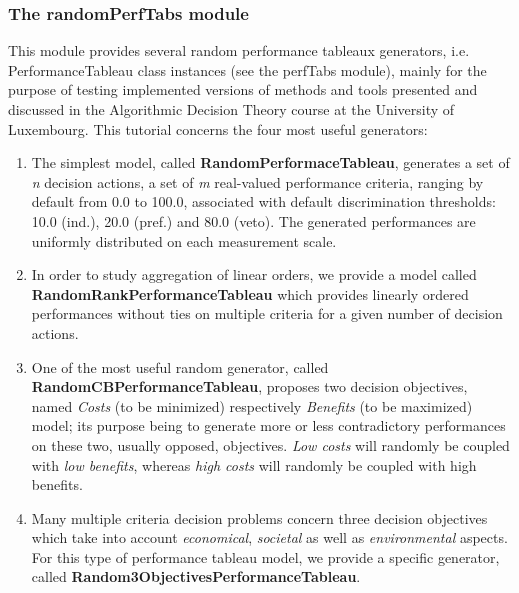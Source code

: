 \documentclass[letterpaper,10pt,english]{sphinxmanual}
\begin{document}
\subsubsection{The randomPerfTabs module}
\label{tutorial:the-randomperftabs-module}
This module provides several random performance tableaux generators, i.e. PerformanceTableau class instances (see the perfTabs module), mainly for the purpose of testing implemented versions of methods and tools presented and discussed in the Algorithmic Decision Theory course at the University of Luxembourg. This tutorial concerns the four most useful generators:
\begin{enumerate}
\item {} 
The simplest model, called \textbf{RandomPerformaceTableau}, generates
a set of \emph{n} decision actions, a set of \emph{m} real-valued
performance criteria, ranging by default from 0.0 to 100.0,
associated with default discrimination thresholds: 10.0 (ind.), 20.0 (pref.) and 80.0 (veto). The generated performances are uniformly distributed on each measurement scale.

\item {} 
In order to study aggregation of linear orders, we provide a model called \textbf{RandomRankPerformanceTableau} which provides linearly ordered performances without ties on multiple criteria for a given number of decision actions.

\item {} 
One of the most useful random generator, called
\textbf{RandomCBPerformanceTableau}, proposes two decision objectives,
named \emph{Costs} (to be minimized) respectively \emph{Benefits} (to be
maximized) model; its purpose being to generate more or less
contradictory performances on these two, usually opposed,
objectives. \emph{Low costs} will randomly be coupled with \emph{low
benefits}, whereas \emph{high costs} will randomly be coupled with high benefits.

\item {} 
Many multiple criteria decision problems concern three decision
objectives which take into account \emph{economical}, \emph{societal} as
well as \emph{environmental} aspects. For this type of performance
tableau model, we provide a specific generator, called \textbf{Random3ObjectivesPerformanceTableau}.

\end{enumerate}
\end{document}
